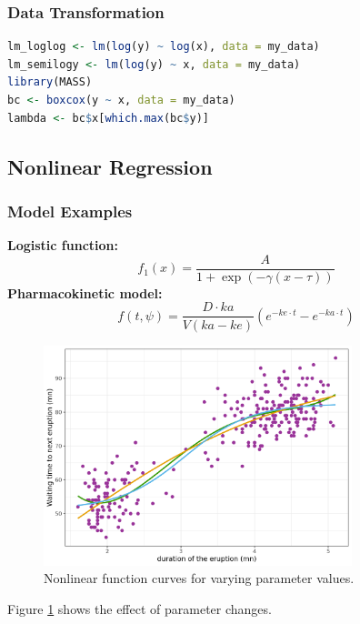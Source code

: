 \documentclass[11pt,a4paper]{article}
\begin{document}
\subsubsection{Data Transformation}
\begin{lstlisting}[language=R]
lm_loglog <- lm(log(y) ~ log(x), data = my_data)
lm_semilogy <- lm(log(y) ~ x, data = my_data)
library(MASS)
bc <- boxcox(y ~ x, data = my_data)
lambda <- bc$x[which.max(bc$y)]
\end{lstlisting}

\subsection{Nonlinear Regression}

\subsubsection{Model Examples}
\textbf{Logistic function:}
\begin{equation}
f_1(x) = \frac{A}{1 + \exp(-\gamma(x - \tau))}
\end{equation}
\textbf{Pharmacokinetic model:}
\begin{equation}
f(t, \psi) = \frac{D \cdot ka}{V(ka-ke)}\left(e^{-ke \cdot t} - e^{-ka \cdot t}\right)
\end{equation}

\begin{figure}[htb]
    \centering
    \includegraphics[width=0.8\textwidth]{nonlinear_model_curve.png}
    \caption{Nonlinear function curves for varying parameter values.}
    \label{fig:nonlinear-function}
\end{figure}

Figure \ref{fig:nonlinear-function} shows the effect of parameter changes.
\end{document}
